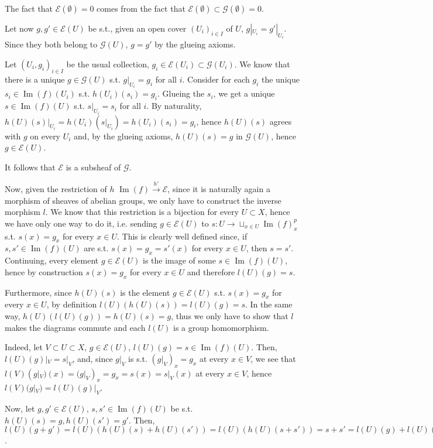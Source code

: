\documentclass{article}
\DeclareMathOperator{\Ima}{Im}
\begin{document}
The fact that $\mathcal{E}(\emptyset)=0$ comes from the fact that $\mathcal{E}(\emptyset)\subset\mathcal{G}(\emptyset)=0$.

Let now $g,g'\in\mathcal{E}(U)$ be s.t., given an open cover $(U_i)_{i\in I}$ of $U$, $g|_{U_i}=g'|_{U_i}$. Since they both belong to $\mathcal{G}(U)$, $g=g'$ by the glueing axioms.

Let $(U_i,g_i)_{i\in I}$ be the usual collection, $g_i\in\mathcal{E}(U_i)\subset\mathcal{G}(U_i)$. We know that there is a unique $g\in\mathcal{G}(U)$ s.t. $g|_{U_i}=g_i$ for all $i$. Consider for each $g_i$ the unique $s_i\in\Ima(f)(U_i)$ s.t. $h(U_i)(s_i)=g_i$. Glueing the $s_i$, we get a unique $s\in\Ima(f)(U)$ s.t. $s|_{U_i}=s_i$ for all $i$. By naturality, $h(U)(s)|_{U_i}=h(U_i)(s|_{U_i})=h(U_i)(s_i)=g_i$, hence $h(U)(s)$ agrees with $g$ on every $U_i$ and, by the glueing axioms, $h(U)(s)=g$ in $\mathcal{G}(U)$, hence $g\in\mathcal{E}(U)$.

It follows that $\mathcal{E}$ is a subsheaf of $\mathcal{G}$.

Now, given the restriction of $h$ $\Ima(f)\xrightarrow{h'}\mathcal{E}$, since it is naturally again a morphism of sheaves of abelian groups, we only have to construct the inverse morphism $l$. We know that this restriction is a bijection for every $U\subset X$, hence we have only one way to do it, i.e. sending $g\in\mathcal{E}(U)$ to $s:U\rightarrow\sqcup_{x\in U} \Ima(f)^p_x$ s.t. $s(x)=g_x$ for every $x\in U$. This is clearly well defined since, if $s,s'\in\Ima(f)(U)$ are s.t. $s(x)=g_x=s'(x)$ for every $x\in U$, then $s=s'$. Continuing, every element $g\in\mathcal{E}(U)$ is the image of some $s\in\Ima(f)(U)$, hence by construction $s(x)=g_x$ for every $x\in U$ and therefore $l(U)(g)=s$.

Furthermore, since $h(U)(s)$ is the element $g\in\mathcal{E}(U)$ s.t. $s(x)=g_x$ for every $x\in U$, by definition $l(U)(h(U)(s))=l(U)(g)=s$. In the same way, $h(U)(l(U)(g))=h(U)(s)=g$, thus we only have to show that $l$ makes the diagrams commute and each $l(U)$ is a group homomorphism.

Indeed, let $V\subset U\subset X$, $g\in\mathcal{E}(U)$, $l(U)(g)=s\in\Ima(f)(U)$. Then, $l(U)(g)|_V=s|_V$, and, since $g|_V$ is s.t. $(g|_V)_x=g_x$ at every $x\in V$, we see that $l(V)(g|_V)(x)=(g|_V)_x=g_x=s(x)=s|_V(x)$ at every $x\in V$, hence $l(V)(g|_V)=l(U)(g)|_V$.

Now, let $g,g'\in\mathcal{E}(U)$, $s,s'\in\Ima(f)(U)$ be s.t. $h(U)(s)=g, h(U)(s')=g'$. Then, $l(U)(g+g')=l(U)(h(U)(s)+h(U)(s'))=l(U)(h(U)(s+s'))=s+s'=l(U)(g)+l(U)(g')$.
\end{document}
